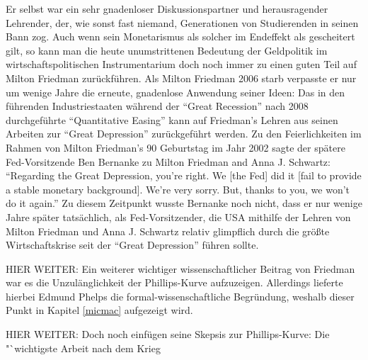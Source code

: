 Er selbst war ein sehr gnadenloser Diskussionspartner und herausragender Lehrender, der, wie sonst fast niemand, Generationen von Studierenden in seinen Bann zog. 
Auch wenn sein Monetarismus als solcher im Endeffekt als gescheitert gilt, so kann man die heute unumstrittenen Bedeutung der Geldpolitik im wirtschaftspolitischen Instrumentarium doch noch immer zu einen guten Teil auf Milton Friedman zurückführen. Als Milton Friedman 2006 starb verpasste er nur um wenige Jahre die erneute, gnadenlose Anwendung seiner Ideen: Das in den führenden Industriestaaten während der "`Great Recession"' nach 2008 durchgeführte "`Quantitative Easing"'  kann auf Friedman's Lehren aus seinen Arbeiten zur "`Great Depression"' zurückgeführt werden. Zu den Feierlichkeiten im Rahmen von Milton Friedman's 90 Geburtstag im Jahr 2002 sagte der spätere Fed-Vorsitzende Ben Bernanke zu Milton Friedman and Anna J. Schwartz: "`Regarding the Great Depression, you’re right. We [the Fed] did it [fail to provide a stable monetary background]. We’re very sorry. But, thanks to you, we won't do it again."' Zu diesem Zeitpunkt wusste Bernanke noch nicht, dass er nur wenige Jahre später tatsächlich, als Fed-Vorsitzender, die USA mithilfe der Lehren von Milton Friedman und Anna J. Schwartz relativ glimpflich durch die größte Wirtschaftskrise seit der "`Great Depression"' führen sollte.








HIER WEITER:
Ein weiterer wichtiger wissenschaftlicher Beitrag von Friedman war es die Unzulänglichkeit der Phillips-Kurve aufzuzeigen. Allerdings lieferte hierbei Edmund Phelps die formal-wissenschaftliche Begründung, weshalb dieser Punkt in Kapitel \ref{micmac} aufgezeigt wird.



HIER WEITER: Doch noch einfügen seine Skepsis zur Phillips-Kurve: Die "`wichtigste Arbeit nach dem Krieg \textcite[S. 160]{Snowdon2005}




